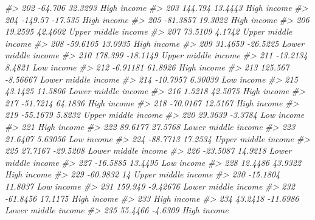 \documentclass[
  xelatex, ja=standard]{bxjsbook}
\newenvironment{Shaded}{\begin{snugshade}}{\end{snugshade}}
\newcommand{\CommentTok}[1]{\textcolor[rgb]{0.56,0.35,0.01}{\textit{#1}}}
\theoremstyle{definition}
\theoremstyle{definition}
\theoremstyle{definition}
\theoremstyle{definition}
\theoremstyle{remark}
\begin{document}
\begin{Shaded}
\begin{Highlighting}[]
\CommentTok{\#\textgreater{} 202    {-}64.706    32.3293         High income}
\CommentTok{\#\textgreater{} 203    144.794    13.4443         High income}
\CommentTok{\#\textgreater{} 204    {-}149.57    {-}17.535         High income}
\CommentTok{\#\textgreater{} 205   {-}81.3857    19.3022         High income}
\CommentTok{\#\textgreater{} 206    19.2595    42.4602 Upper middle income}
\CommentTok{\#\textgreater{} 207    73.5109     4.1742 Upper middle income}
\CommentTok{\#\textgreater{} 208   {-}59.6105    13.0935         High income}
\CommentTok{\#\textgreater{} 209    31.4659   {-}26.5225 Lower middle income}
\CommentTok{\#\textgreater{} 210    178.399   {-}18.1149 Upper middle income}
\CommentTok{\#\textgreater{} 211   {-}13.2134     8.4821          Low income}
\CommentTok{\#\textgreater{} 212   {-}6.91181    61.8926         High income}
\CommentTok{\#\textgreater{} 213    125.567   {-}8.56667 Lower middle income}
\CommentTok{\#\textgreater{} 214   {-}10.7957    6.30039          Low income}
\CommentTok{\#\textgreater{} 215    43.1425    11.5806 Lower middle income}
\CommentTok{\#\textgreater{} 216     1.5218    42.5075         High income}
\CommentTok{\#\textgreater{} 217   {-}51.7214    64.1836         High income}
\CommentTok{\#\textgreater{} 218   {-}70.0167    12.5167         High income}
\CommentTok{\#\textgreater{} 219   {-}55.1679     5.8232 Upper middle income}
\CommentTok{\#\textgreater{} 220    29.3639    {-}3.3784          Low income}
\CommentTok{\#\textgreater{} 221                               High income}
\CommentTok{\#\textgreater{} 222    89.6177    27.5768 Lower middle income}
\CommentTok{\#\textgreater{} 223    21.6407    5.63056          Low income}
\CommentTok{\#\textgreater{} 224   {-}88.7713    17.2534 Upper middle income}
\CommentTok{\#\textgreater{} 225    27.7167   {-}29.5208 Lower middle income}
\CommentTok{\#\textgreater{} 226   {-}23.5087    14.9218 Lower middle income}
\CommentTok{\#\textgreater{} 227   {-}16.5885    13.4495          Low income}
\CommentTok{\#\textgreater{} 228    12.4486    43.9322         High income}
\CommentTok{\#\textgreater{} 229   {-}60.9832         14 Upper middle income}
\CommentTok{\#\textgreater{} 230   {-}15.1804    11.8037          Low income}
\CommentTok{\#\textgreater{} 231    159.949   {-}9.42676 Lower middle income}
\CommentTok{\#\textgreater{} 232   {-}61.8456    17.1175         High income}
\CommentTok{\#\textgreater{} 233                               High income}
\CommentTok{\#\textgreater{} 234    43.2418   {-}11.6986 Lower middle income}
\CommentTok{\#\textgreater{} 235    55.4466    {-}4.6309         High income}

\end{Highlighting}
\end{Shaded}
\end{document}
